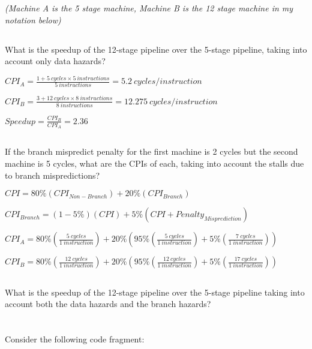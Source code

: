 \documentclass{article}
\begin{document}
\textit{(Machine A is the 5 stage machine, Machine B is the 12 stage machine in my notation below)}
\begin{adjustwidth}{2.5em}{0pt}
\subsection{}
What is the speedup of the 12-stage pipeline over the 5-stage pipeline, taking into account only data hazards?

\vspace{5mm}
$CPI_{A}=\frac{1+5\ cycles\times{5\ instructions}}{5\ instructions}= 5.2\ cycles/instruction$

\vspace{3mm} 
$CPI_{B}=\frac{3+12\ cycles\times{8\ instructions}}{8\ instructions} = 12.275\ cycles/instruction$

\vspace{3mm} 
$Speedup=\frac{CPI_{B}}{CPI_{A}}=2.36$
\subsection{} 
If the branch mispredict penalty for the first machine is 2 cycles but the second machine is 5 cycles, what are the CPIs of each, taking into account the stalls due to branch mispredictions?

\vspace{5mm}	
$CPI=80\%(CPI_{Non-Branch})+20\%(CPI_{Branch})$ 

\vspace{3mm}
$CPI_{Branch}=(1-5\%)(CPI)+5\%(CPI+Penalty_{Misprediction})$

\vspace{3mm}
$CPI_{A}=80\%(\frac{5\ cycles}{1\ instruction})+20\%(95\%(\frac{5\ cycles}{1\ instruction})+5\%(\frac{7\ cycles}{1\ instruction}))$

\vspace{3mm}
$CPI_{B}=80\%(\frac{12\ cycles}{1\ instruction})+20\%(95\%(\frac{12\ cycles}{1\ instruction})+5\%(\frac{17\ cycles}{1\ instruction}))$

\subsection{} 
What is the speedup of the 12-stage pipeline over the 5-stage pipeline taking into account both the data hazards and the branch hazards?
\end{adjustwidth}
\section{}
Consider the following code fragment: 
\end{document}
